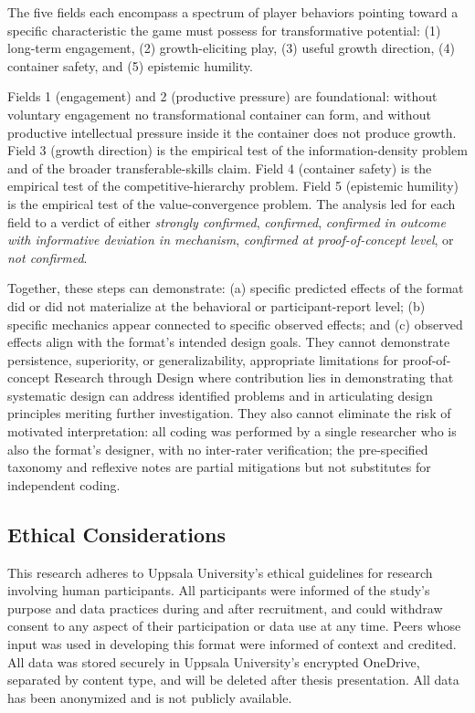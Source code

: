 The five fields each encompass a spectrum of player behaviors pointing toward a specific characteristic the game must possess for transformative potential: (1) long-term engagement, (2) growth-eliciting play, (3) useful growth direction, (4) container safety, and (5) epistemic humility.

Fields 1 (engagement) and 2 (productive pressure) are foundational: without voluntary engagement no transformational container can form, and without productive intellectual pressure inside it the container does not produce growth. Field 3 (growth direction) is the empirical test of the information-density problem and of the broader transferable-skills claim. Field 4 (container safety) is the empirical test of the competitive-hierarchy problem. Field 5 (epistemic humility) is the empirical test of the value-convergence problem. The analysis led for each field to a verdict of either \textit{strongly confirmed}, \textit{confirmed}, \textit{confirmed in outcome with informative deviation in mechanism}, \textit{confirmed at proof-of-concept level}, or \textit{not confirmed}.

Together, these steps can demonstrate: (a) specific predicted effects of the format did or did not materialize at the behavioral or participant-report level; (b) specific mechanics appear connected to specific observed effects; and (c) observed effects align with the format's intended design goals. They cannot demonstrate persistence, superiority, or generalizability, appropriate limitations for proof-of-concept Research through Design where contribution lies in demonstrating that systematic design can address identified problems and in articulating design principles meriting further investigation. They also cannot eliminate the risk of motivated interpretation: all coding was performed by a single researcher who is also the format's designer, with no inter-rater verification; the pre-specified taxonomy and reflexive notes are partial mitigations but not substitutes for independent coding.

\subsection{Ethical Considerations}

This research adheres to Uppsala University's ethical guidelines for research involving human participants. All participants were informed of the study's purpose and data practices during and after recruitment, and could withdraw consent to any aspect of their participation or data use at any time. Peers whose input was used in developing this format were informed of context and credited. All data was stored securely in Uppsala University's encrypted OneDrive, separated by content type, and will be deleted after thesis presentation. All data has been anonymized and is not publicly available.

